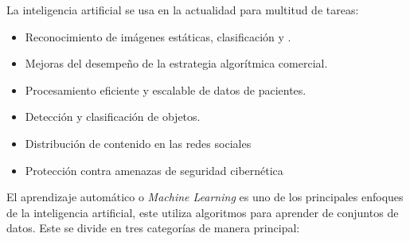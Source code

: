 La inteligencia artificial se usa en la actualidad para multitud de tareas:

\begin{itemize}
	\item Reconocimiento de imágenes estáticas, clasificación y .
	
	\item Mejoras del desempeño de la estrategia algorítmica comercial.
	
	\item Procesamiento eficiente y escalable de datos de pacientes.
	
	\item Detección y clasificación de objetos.
	
	\item Distribución de contenido en las redes sociales
	
	\item Protección contra amenazas de seguridad cibernética
	
\end{itemize}

El aprendizaje automático o \textit{Machine Learning}\cite{ibmQuMachine} es uno de los principales enfoques de la inteligencia artificial, este utiliza algoritmos para aprender de conjuntos de datos. Este se divide en tres categorías de manera principal:

